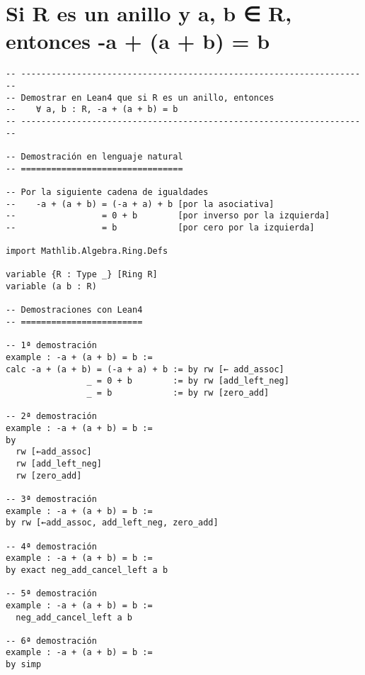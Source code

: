 \section{Si R es un anillo y a, b ∈ R, entonces -a + (a + b) = b}
\label{sec:orgb3d651b}
\begin{verbatim}
-- ---------------------------------------------------------------------
-- Demostrar en Lean4 que si R es un anillo, entonces
--    ∀ a, b : R, -a + (a + b) = b
-- ---------------------------------------------------------------------

-- Demostración en lenguaje natural
-- ================================

-- Por la siguiente cadena de igualdades
--    -a + (a + b) = (-a + a) + b [por la asociativa]
--                 = 0 + b        [por inverso por la izquierda]
--                 = b            [por cero por la izquierda]

import Mathlib.Algebra.Ring.Defs

variable {R : Type _} [Ring R]
variable (a b : R)

-- Demostraciones con Lean4
-- ========================

-- 1ª demostración
example : -a + (a + b) = b :=
calc -a + (a + b) = (-a + a) + b := by rw [← add_assoc]
                _ = 0 + b        := by rw [add_left_neg]
                _ = b            := by rw [zero_add]

-- 2ª demostración
example : -a + (a + b) = b :=
by
  rw [←add_assoc]
  rw [add_left_neg]
  rw [zero_add]

-- 3ª demostración
example : -a + (a + b) = b :=
by rw [←add_assoc, add_left_neg, zero_add]

-- 4ª demostración
example : -a + (a + b) = b :=
by exact neg_add_cancel_left a b

-- 5ª demostración
example : -a + (a + b) = b :=
  neg_add_cancel_left a b

-- 6ª demostración
example : -a + (a + b) = b :=
by simp
\end{verbatim}

